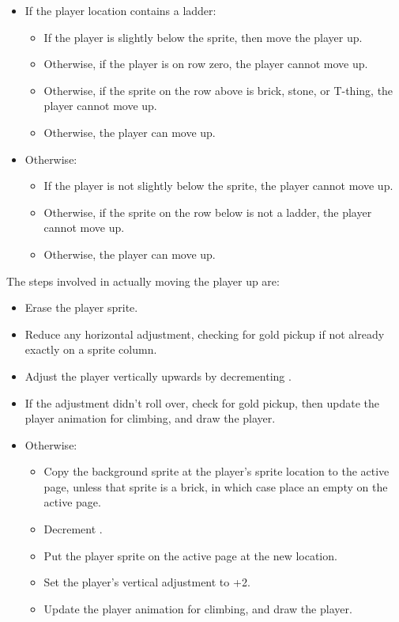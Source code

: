 \documentclass[10pt]{report}%
\begin{document}
\begin{itemize}
  \item If the player location contains a ladder:
  \begin{itemize}
    \item If the player is slightly below the sprite, then move the player up.
    \item Otherwise, if the player is on row zero, the player cannot move up.
    \item Otherwise, if the sprite on the row above is brick, stone, or T-thing,
          the player cannot move up.
    \item Otherwise, the player can move up.
  \end{itemize}
  \item Otherwise:
  \begin{itemize}
    \item If the player is not slightly below the sprite, the player cannot move up.
    \item Otherwise, if the sprite on the row below is not a ladder, the player cannot move up.
    \item Otherwise, the player can move up.
  \end{itemize}
\end{itemize}

The steps involved in actually moving the player up are:

\begin{itemize}
    \item Erase the player sprite.
    \item Reduce any horizontal adjustment, checking for gold pickup if not already exactly on a sprite column.
    \item Adjust the player vertically upwards by decrementing {\Tt{}\nwendquote}.
    \item If the adjustment didn't roll over, check for gold pickup, then update
          the player animation for climbing, and draw the player.
    \item Otherwise:
    \begin{itemize}
        \item Copy the background sprite at the player's sprite location to the active page, unless
              that sprite is a brick, in which case place an empty on the active page.
        \item Decrement {\Tt{}\nwendquote}.
        \item Put the player sprite on the active page at the new location.
        \item Set the player's vertical adjustment to {\Tt{}+2\nwendquote}.
        \item Update the player animation for climbing, and draw the player.
    \end{itemize}
\end{itemize}
\end{document}
